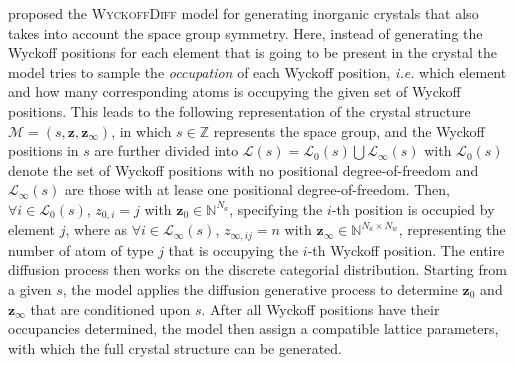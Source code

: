 \citet{kelvinius2025wyckoffdiff} proposed the \textsc{WyckoffDiff} model for generating inorganic crystals that also takes into account the space group symmetry. Here, instead of generating the Wyckoff positions for each element that is going to be present in the crystal the model tries to sample the \emph{occupation} of each Wyckoff position, \emph{i.e.} which element and how many corresponding atoms is occupying the given set of Wyckoff positions. This leads to the following representation of the crystal structure $\mathcal{M}=(s,\bm{z},\bm{z}_\infty)$, in which $s\in\mathbb{Z}$ represents the space group, and the Wyckoff positions in $s$ are further divided into $\mathcal{L}(s)=\mathcal{L}_0(s)\bigcup\mathcal{L}_{\infty}(s)$ with $\mathcal{L}_0(s)$ denote the set of Wyckoff positions with no positional degree-of-freedom and $\mathcal{L}_{\infty}(s)$ are those with at lease one positional degree-of-freedom. Then, $\forall i\in\mathcal{L}_0(s)$, $z_{0,i}=j$ with $\bm{z}_{0}\in\mathbb{N}^{N_a}$, specifying the $i$-th position is occupied by element $j$, where as $\forall i\in\mathcal{L}_{\infty}(s)$, $z_{\infty,ij}=n$ with $\bm{z}_\infty\in\mathbb{N}^{N_a\times N_w}$, representing the number of atom of type $j$ that is occupying the $i$-th Wyckoff position. The entire diffusion process then works on the discrete categorial distribution. Starting from a given $s$, the model applies the diffusion generative process to determine $\bm{z}_0$ and $\bm{z}_\infty$ that are conditioned upon $s$. After all Wyckoff positions have their occupancies determined, the model then assign a compatible lattice parameters, with which the full crystal structure can be generated.


